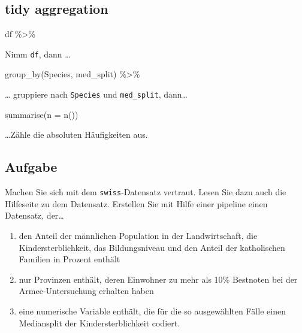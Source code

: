 \documentclass[
]{book}
\newenvironment{Shaded}{\begin{snugshade}}{\end{snugshade}}
\newcommand{\AttributeTok}[1]{\textcolor[rgb]{0.77,0.63,0.00}{#1}}
\newcommand{\FunctionTok}[1]{\textcolor[rgb]{0.00,0.00,0.00}{#1}}
\newcommand{\NormalTok}[1]{#1}
\newcommand{\SpecialCharTok}[1]{\textcolor[rgb]{0.00,0.00,0.00}{#1}}
\begin{document}
\hypertarget{tidy-aggregation-6}{%
\subsection{tidy aggregation}\label{tidy-aggregation-6}}

\begin{Shaded}
\begin{Highlighting}[]
\NormalTok{df }\SpecialCharTok{\%\textgreater{}\%} 
\end{Highlighting}
\end{Shaded}

Nimm \texttt{df}, dann \ldots{}

\begin{Shaded}
\begin{Highlighting}[]
  \FunctionTok{group\_by}\NormalTok{(Species, med\_split) }\SpecialCharTok{\%\textgreater{}\%} 
\end{Highlighting}
\end{Shaded}

\ldots{} gruppiere nach \texttt{Species} und \texttt{med\_split}, dann\ldots{}

\begin{Shaded}
\begin{Highlighting}[]
  \FunctionTok{summarise}\NormalTok{(}\AttributeTok{n =} \FunctionTok{n}\NormalTok{()) }
\end{Highlighting}
\end{Shaded}

\ldots Zähle die absoluten Häufigkeiten aus.

\hypertarget{aufgabe}{%
\subsection{Aufgabe}\label{aufgabe}}

Machen Sie sich mit dem \texttt{swiss}-Datensatz vertraut. Lesen Sie dazu auch die Hilfeseite zu dem Datensatz.
Erstellen Sie mit Hilfe einer pipeline einen Datensatz, der\ldots{}

\begin{enumerate}
\def\labelenumi{\arabic{enumi}.}
\item
  den Anteil der männlichen Population in der Landwirtschaft, die Kindersterblichkeit, das Bildungsniveau und den Anteil der katholischen Familien in Prozent enthält
\item
  nur Provinzen enthält, deren Einwohner zu mehr als 10\% Bestnoten bei der Armee-Untersuchung erhalten haben
\item
  eine numerische Variable enthält, die für die so ausgewählten Fälle einen Mediansplit der Kindersterblichkeit codiert.
\end{enumerate}
\end{document}
